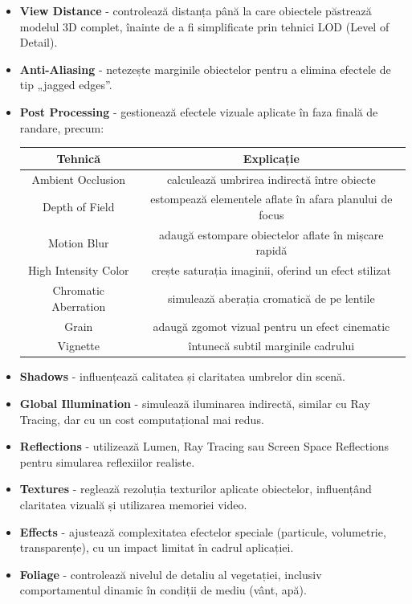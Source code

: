 \begin{itemize}
\item \textbf{View Distance} - controlează distanța până la care obiectele păstrează modelul 3D complet, înainte de a fi simplificate prin tehnici LOD (Level of Detail).
\item \textbf{Anti-Aliasing} - netezește marginile obiectelor pentru a elimina efectele de tip „jagged edges”.
\item \textbf{Post Processing} - gestionează efectele vizuale aplicate în faza finală de randare, precum:
\begin{center}
\begin{tabular}{||c c||} 
 \hline
 Tehnică & Explicație \\ [0.5ex] 
 \hline\hline
 Ambient Occlusion & calculează umbrirea indirectă între obiecte \\ 
 \hline
 Depth of Field & estompează elementele aflate în afara planului de focus \\
 \hline
 Motion Blur & adaugă estompare obiectelor aflate în mișcare rapidă \\
 \hline
 High Intensity Color & crește saturația imaginii, oferind un efect stilizat  \\ [1ex] 
 \hline
 Chromatic Aberration & simulează aberația cromatică de pe lentile  \\ [1ex] 
 \hline
 Grain & adaugă zgomot vizual pentru un efect cinematic  \\ [1ex] 
 \hline
 Vignette & întunecă subtil marginile cadrului  \\ [1ex] 
 \hline
\end{tabular}
\end{center}

\item \textbf{Shadows} - influențează calitatea și claritatea umbrelor din scenă.
\item \textbf{Global Illumination} - simulează iluminarea indirectă, similar cu Ray Tracing, dar cu un cost computațional mai redus.
\item \textbf{Reflections} - utilizează Lumen, Ray Tracing sau Screen Space Reflections pentru simularea reflexiilor realiste.
\item \textbf{Textures} - reglează rezoluția texturilor aplicate obiectelor, influențând claritatea vizuală și utilizarea memoriei video.
\item \textbf{Effects} - ajustează complexitatea efectelor speciale (particule, volumetrie, transparențe), cu un impact limitat în cadrul aplicației.
\item \textbf{Foliage} - controlează nivelul de detaliu al vegetației, inclusiv comportamentul dinamic în condiții de mediu (vânt, apă).

\end{itemize}

